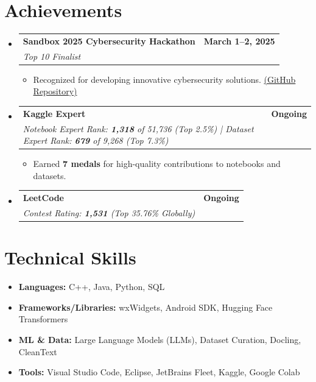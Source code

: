 \documentclass[letterpaper,10pt]{article}
\makeatletter
\newcommand{\resumeSubHeadingListStart}{\begin{itemize}[leftmargin=0.15in,label={}]}
\newcommand{\resumeSubHeadingListEnd}{\end{itemize}}
\newcommand{\resumeSubheading}[4]{%
  \item
  \begin{tabular*}{1.0\textwidth}[t]{l@{\extracolsep{\fill}}r}
    \textbf{#1} & {\small\bfseries #2} \\
    \textit{\color{primary} #3} & {\textit{\color{primary} #4}} \\
  \end{tabular*}\vspace{-2pt}
}
\newcommand{\resumeItemListStart}{\begin{itemize}[leftmargin=12pt]}
\newcommand{\resumeItemListEnd}{\end{itemize}}
\newcommand{\resumeItem}[1]{\item\small{#1}}
\makeatother
\begin{document}
\section{Achievements}
\resumeSubHeadingListStart

  \resumeSubheading
    {Sandbox 2025 Cybersecurity Hackathon}{March 1–2, 2025}
    {Top 10 Finalist}{}
    \resumeItemListStart
      \resumeItem{Recognized for developing innovative cybersecurity solutions. \href{https://github.com/EchoSingh/ML-DeepFake-Detection-Defense--BAM-}{(GitHub Repository)}}
    \resumeItemListEnd

  \resumeSubheading
    {Kaggle Expert}{Ongoing}
    {Notebook Expert Rank: \textbf{1,318} of 51,736 (Top 2.5\%) \quad | \quad Dataset Expert Rank: \textbf{679} of 9,268 (Top 7.3\%)}{}
    \resumeItemListStart
      \resumeItem{Earned \textbf{7 medals} for high-quality contributions to notebooks and datasets.}
    \resumeItemListEnd

  \resumeSubheading
    {LeetCode}{Ongoing}
    {Contest Rating: \textbf{1,531} (Top 35.76\% Globally)}{}

\resumeSubHeadingListEnd



\section*{Technical Skills}
\vspace{5pt}
\begin{itemize}[leftmargin=0.15in, label={}]
    \item \textbf{Languages:} C++, Java, Python, SQL 
    \item\textbf{Frameworks/Libraries:} wxWidgets, Android SDK, Hugging Face Transformers
    \item \textbf{ML \& Data:} Large Language Models (LLMs), Dataset Curation, Docling, CleanText
    \item \textbf{Tools:} Visual Studio Code, Eclipse, JetBrains Fleet, Kaggle, Google Colab
\end{itemize}
\end{document}
